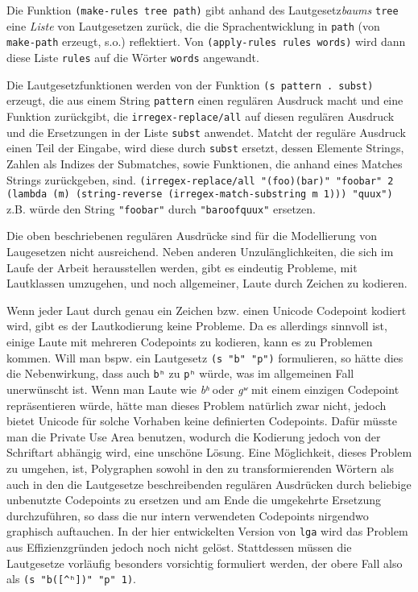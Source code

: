 \documentclass[12pt,a4paper,normalheadings]{scrartcl}
\def\bel#1{\textit{#1}}
\def\tt#1{\texttt{#1}}
\begin{document}
Die Funktion \tt{(make-rules tree path)}
gibt anhand des Lautgesetz\emph{baums} \tt{tree} eine \emph{Liste}
von Lautgesetzen zurück,
die die Sprachentwicklung in \tt{path} (von \tt{make-path} erzeugt, s.o.)
reflektiert.
Von \tt{(apply-rules rules words)} wird dann diese Liste \tt{rules}
auf die Wörter \tt{words} angewandt.

Die Lautgesetzfunktionen werden von der Funktion \tt{(s pattern . subst)}
erzeugt,
die aus einem String \tt{pattern} einen regulären Ausdruck macht
und eine Funktion zurückgibt,
die \tt{irregex-replace/all} auf diesen regulären Ausdruck
und die Ersetzungen in der Liste \tt{subst} anwendet.
Matcht der reguläre Ausdruck einen Teil der Eingabe,
wird diese durch \tt{subst} ersetzt,
dessen Elemente Strings, Zahlen als Indizes der Submatches, sowie
Funktionen, die anhand eines Matches Strings zurückgeben, sind.
\tt{(irregex-replace/all "(foo)(bar)" "foobar" 2 (lambda (m)
    (string-reverse (irregex-match-substring m 1))) "quux")}
z.B. würde den String \tt{"foobar"} durch \tt{"baroofquux"} ersetzen.

Die oben beschriebenen regulären Ausdrücke
sind für die Modellierung von Laugesetzen nicht ausreichend.
Neben anderen Unzulänglichkeiten,
die sich im Laufe der Arbeit herausstellen werden,
gibt es eindeutig Probleme, mit Lautklassen umzugehen,
und noch allgemeiner, Laute durch Zeichen zu kodieren.

Wenn jeder Laut durch genau ein Zeichen bzw. einen Unicode Codepoint kodiert wird,
gibt es der Lautkodierung keine Probleme.
Da es allerdings sinnvoll ist,
einige Laute mit mehreren Codepoints zu kodieren,
kann es zu Problemen kommen.
Will man bspw. ein Lautgesetz \tt{(s "b" "p")} formulieren,
so hätte dies die Nebenwirkung,
dass auch \tt{bʰ} zu \tt{pʰ} würde,
was im allgemeinen Fall unerwünscht ist.
Wenn man Laute wie \bel{bʰ} oder \bel{gʷ} mit einem einzigen Codepoint
repräsentieren würde,
hätte man dieses Problem natürlich zwar nicht,
jedoch bietet Unicode für solche Vorhaben keine definierten Codepoints.
Dafür müsste man die Private Use Area benutzen,
wodurch die Kodierung jedoch von der Schriftart abhängig wird,
eine unschöne Lösung.
Eine Möglichkeit, dieses Problem zu umgehen, ist,
Polygraphen sowohl in den zu transformierenden Wörtern als auch in den
die Lautgesetze beschreibenden regulären Ausdrücken durch
beliebige unbenutzte Codepoints zu ersetzen
und am Ende die umgekehrte Ersetzung durchzuführen,
so dass die nur intern verwendeten Codepoints nirgendwo graphisch auftauchen.
In der hier entwickelten Version von \tt{lga} wird das Problem
aus Effizienzgründen jedoch noch nicht gelöst.
Stattdessen müssen die Lautgesetze vorläufig
besonders vorsichtig formuliert werden,
der obere Fall also als \tt{(s "b([\textasciicircum{}ʰ])" "p" 1)}.
\end{document}
